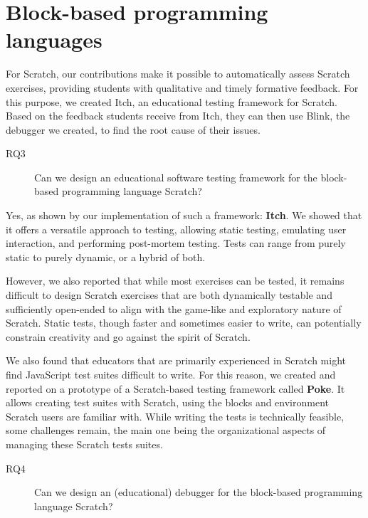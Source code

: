 \documentclass[main]{subfiles}
\begin{document}
\section{Block-based programming languages}\label{sec:for-block-based-programming-languages}

For Scratch, our contributions make it possible to automatically assess Scratch exercises, providing students with qualitative and timely formative feedback.
For this purpose, we created Itch, an educational testing framework for Scratch.
Based on the feedback students receive from Itch, they can then use Blink, the debugger we created, to find the root cause of their issues.

\begin{description}
    \item[RQ3] Can we design an educational software testing framework for the block-based programming language Scratch?
\end{description}

Yes, as shown by our implementation of such a framework: \textbf{Itch}.
We showed that it offers a versatile approach to testing, allowing static testing, emulating user interaction, and performing post-mortem testing.
Tests can range from purely static to purely dynamic, or a hybrid of both.

However, we also reported that while most exercises can be tested, it remains difficult to design Scratch exercises that are both dynamically testable and sufficiently open-ended to align with the game-like and exploratory nature of Scratch.
Static tests, though faster and sometimes easier to write, can potentially constrain creativity and go against the spirit of Scratch.

We also found that educators that are primarily experienced in Scratch might find JavaScript test suites difficult to write.
For this reason, we created and reported on a prototype of a Scratch-based testing framework called \textbf{Poke}.
It allows creating test suites with Scratch, using the blocks and environment Scratch users are familiar with.
While writing the tests is technically feasible, some challenges remain, the main one being the organizational aspects of managing these Scratch tests suites.

\begin{description}
    \item[RQ4] Can we design an (educational) debugger for the block-based programming language Scratch?
\end{description}
\end{document}
